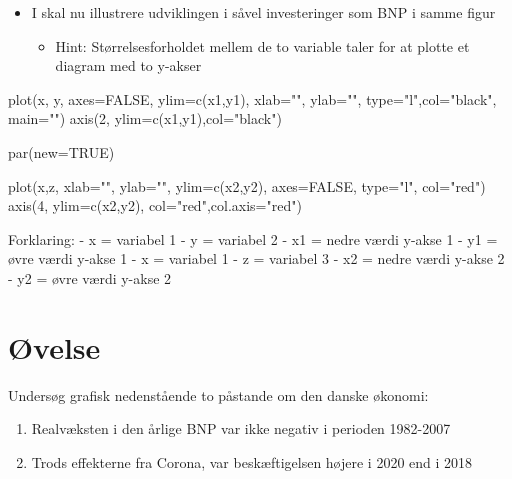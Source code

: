 \documentclass[
  12pt,
]{article}
\newenvironment{Shaded}{\begin{snugshade}}{\end{snugshade}}
\newcommand{\AttributeTok}[1]{\textcolor[rgb]{0.77,0.63,0.00}{#1}}
\newcommand{\ConstantTok}[1]{\textcolor[rgb]{0.00,0.00,0.00}{#1}}
\newcommand{\DecValTok}[1]{\textcolor[rgb]{0.00,0.00,0.81}{#1}}
\newcommand{\FunctionTok}[1]{\textcolor[rgb]{0.00,0.00,0.00}{#1}}
\newcommand{\NormalTok}[1]{#1}
\newcommand{\StringTok}[1]{\textcolor[rgb]{0.31,0.60,0.02}{#1}}
\providecommand{\tightlist}{%
  \setlength{\itemsep}{0pt}\setlength{\parskip}{0pt}}
\begin{document}
\begin{itemize}
\tightlist
\item
  I skal nu illustrere udviklingen i såvel investeringer som BNP i samme
  figur

  \begin{itemize}
  \tightlist
  \item
    Hint: Størrelsesforholdet mellem de to variable taler for at plotte
    et diagram med to y-akser
  \end{itemize}
\end{itemize}

\begin{Shaded}
\begin{Highlighting}[]
\FunctionTok{plot}\NormalTok{(x, y, }\AttributeTok{axes=}\ConstantTok{FALSE}\NormalTok{, }\AttributeTok{ylim=}\FunctionTok{c}\NormalTok{(x1,y1), }\AttributeTok{xlab=}\StringTok{""}\NormalTok{, }\AttributeTok{ylab=}\StringTok{""}\NormalTok{, }
\AttributeTok{type=}\StringTok{"l"}\NormalTok{,}\AttributeTok{col=}\StringTok{"black"}\NormalTok{, }\AttributeTok{main=}\StringTok{""}\NormalTok{)}
\FunctionTok{axis}\NormalTok{(}\DecValTok{2}\NormalTok{, }\AttributeTok{ylim=}\FunctionTok{c}\NormalTok{(x1,y1),}\AttributeTok{col=}\StringTok{"black"}\NormalTok{)  }
  
\FunctionTok{par}\NormalTok{(}\AttributeTok{new=}\ConstantTok{TRUE}\NormalTok{)}
  
\FunctionTok{plot}\NormalTok{(x,z, }\AttributeTok{xlab=}\StringTok{""}\NormalTok{, }\AttributeTok{ylab=}\StringTok{""}\NormalTok{, }\AttributeTok{ylim=}\FunctionTok{c}\NormalTok{(x2,y2), }
    \AttributeTok{axes=}\ConstantTok{FALSE}\NormalTok{, }\AttributeTok{type=}\StringTok{"l"}\NormalTok{, }\AttributeTok{col=}\StringTok{"red"}\NormalTok{)}
\FunctionTok{axis}\NormalTok{(}\DecValTok{4}\NormalTok{, }\AttributeTok{ylim=}\FunctionTok{c}\NormalTok{(x2,y2), }\AttributeTok{col=}\StringTok{"red"}\NormalTok{,}\AttributeTok{col.axis=}\StringTok{"red"}\NormalTok{)}
\end{Highlighting}
\end{Shaded}

Forklaring: - x = variabel 1 - y = variabel 2 - x1 = nedre værdi y-akse
1 - y1 = øvre værdi y-akse 1 - x = variabel 1 - z = variabel 3 - x2 =
nedre værdi y-akse 2 - y2 = øvre værdi y-akse 2

\hypertarget{uxf8velse-3}{%
\section{Øvelse}\label{uxf8velse-3}}

Undersøg grafisk nedenstående to påstande om den danske økonomi:

\begin{enumerate}
\def\labelenumi{\arabic{enumi}.}
\tightlist
\item
  Realvæksten i den årlige BNP var ikke negativ i perioden 1982-2007
\item
  Trods effekterne fra Corona, var beskæftigelsen højere i 2020 end i
  2018
\end{enumerate}

  
\end{document}
